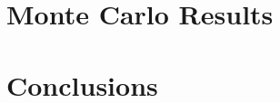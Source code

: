 \documentclass[preprint,12pt]{elsarticle}
\begin{document}
\section{Monte Carlo Results}


\section{Conclusions}


\vspace{30mm}





\begin{thebibliography}{00}


\end{thebibliography}
\end{document}
